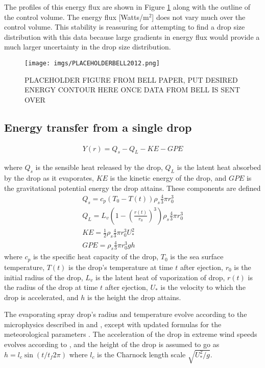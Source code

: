 \documentclass[10pt,a4paper]{article}
\begin{document}
The profiles of this energy flux are shown in Figure \ref{Fig:CBLASTContour} along with the outline of the control volume. The energy flux [Watts/m$^2$] does not vary much over the control volume. This stability is reassuring for attempting to find a drop size distribution with this data because large gradients in energy flux would provide a much larger uncertainty in the drop size distribution.
\begin{figure}[h!]
\centering
\texttt{[image: imgs/PLACEHOLDERBELL2012.png]}
\caption{PLACEHOLDER FIGURE FROM BELL PAPER, PUT DESIRED ENERGY CONTOUR HERE ONCE DATA FROM BELL IS SENT OVER\label{Fig:CBLASTContour}}
\end{figure}




\subsection{Energy transfer from a single drop}

\begin{align}
Y(r) = Q_s - Q_L - KE - GPE
\end{align}

where $Q_s$ is the sensible heat released by the drop, $Q_L$ is the latent heat absorbed by the drop as it evaporates, $KE$ is the kinetic energy of the drop, and $GPE$ is the gravitational potential energy the drop attains. These components are defined
\begin{align}
Q_s = c_p(T_0-T(t))\rho_s\frac{4}{3}\pi r_0^3\\
Q_L = L_v\left(1-\left(\frac{r(t)}{r_0}\right)^3\right)\rho_s\frac{4}{3}\pi r_0^3\\
KE = \frac{1}{2}\rho_s\frac{4}{3}\pi r_0^3U_*^2\\
GPE = \rho_s\frac{4}{3}\pi r_0^3gh
\end{align}
where $c_p$ is the specific heat capacity of the drop, $T_0$ is the sea surface temperature, $T(t)$ is the drop's temperature at time $t$ after ejection, $r_0$ is the initial radius of the drop, $L_v$ is the latent heat of vaporization of drop, $r(t)$ is the radius of the drop at time $t$ after ejection, $U_*$ is the velocity to which the drop is accelerated, and $h$ is the height the drop attains.\par
The evaporating spray drop's radius and temperature evolve according to the microphysics described in \citet{Pruppacher1978} and \citet{Andreas1990}, except with updated formulas for the meteorological parameters \citep{Sharqawy2010,Nayar2016}. The acceleration of the drop in extreme wind speeds evolves according to \citet{Andreas2004}, and the height of the drop is assumed to go as $h = l_c\sin(t/t_f2\pi)$ where $l_c$ is the Charnock length scale $\sqrt{U_*^2/g}$.
\end{document}
